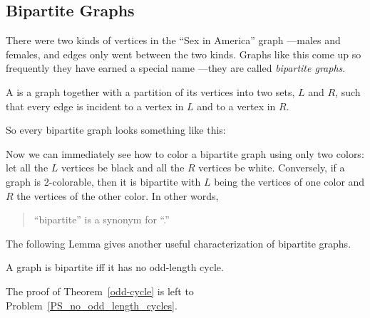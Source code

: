 \begin{problems}
\classproblems
{}


\homeworkproblems
{}

\end{problems}

\label{bipartitesec}

\subsection{Bipartite Graphs}\label{bipartitesubsec}
There were two kinds of vertices in the ``Sex in America'' graph ---males
and females, and edges only went between the two kinds.  Graphs like this
come up so frequently they have earned a special name ---they are called
\emph{bipartite graphs}.

\begin{definition}
A  is a graph together with a partition of its
vertices into two sets, $L$ and $R$, such that every edge is incident to a
vertex in $L$ and to a vertex in $R$.
\end{definition}

So every bipartite graph looks something like this:


Now we can immediately see how to color a bipartite graph using only two
colors: let all the $L$ vertices be black and all the $R$ vertices be
white.  Conversely, if a graph is 2-colorable, then it is bipartite with
$L$ being the vertices of one color and $R$ the vertices of the other
color.  In other words,
\begin{quote}
``bipartite'' is a synonym for ``.''
\end{quote}
The following Lemma gives another useful characterization of bipartite
graphs.

{\begin{theorem}\label{odd-cycle}
A graph is bipartite iff it has no odd-length cycle.
\end{theorem}}
The proof of Theorem~\ref{odd-cycle} is left to
Problem~\ref{PS_no_odd_length_cycles}.


